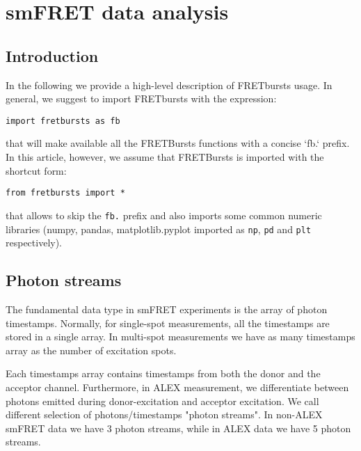 \section{smFRET data analysis}

\subsection{Introduction}

In the following we provide a high-level description of FRETbursts usage. In general, we suggest to import FRETbursts with the expression:

\verb|import fretbursts as fb|

that will make available all the FRETBursts functions with a concise `fb.` prefix. In this article, however, we assume that FRETBursts is imported with the shortcut form:

\verb|from fretbursts import *|

that allows to skip the \verb|fb.| prefix and also imports some common numeric libraries (numpy, pandas, matplotlib.pyplot imported as \verb|np|, \verb|pd| and \verb|plt| respectively).

\subsection{Photon streams}

The fundamental data type in smFRET experiments is the array of photon timestamps. Normally, for single-spot measurements, all the timestamps are stored in a single array. In multi-spot measurements we have as many timestamps array as the number of excitation spots.

Each timestamps array contains timestamps from both the donor and the acceptor channel. Furthermore, in ALEX measurement, we differentiate between photons emitted during donor-excitation and acceptor excitation. We call different selection of photons/timestamps "photon streams". In non-ALEX smFRET data we have 3 photon streams, while in ALEX data we have 5 photon streams.